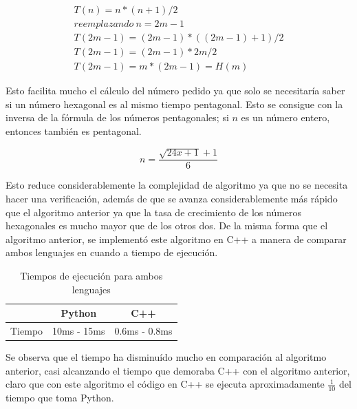 \documentclass[12pt]{article}
\begin{document}
\begin{equation}
   \begin{gathered}
      T(n) = n * (n + 1) / 2\\
      reemplazando ~n = 2m - 1\\
      T(2m - 1) = (2m - 1) * ((2m - 1) + 1) / 2\\
      T(2m - 1) = (2m - 1) * 2m / 2\\
      T(2m - 1) = m * (2m - 1) = H(m)
   \end{gathered}
\end{equation}

Esto facilita mucho el cálculo del número pedido ya que solo se necesitaría saber si un número hexagonal es al mismo tiempo pentagonal. Esto se consigue con la inversa de la fórmula de los números pentagonales; si $ n $ es un número entero, entonces también es pentagonal.

\begin{equation}
   n = \frac{\sqrt{24x + 1} + 1}{6}
\end{equation}

Esto reduce considerablemente la complejidad de algoritmo ya que no se necesita hacer una verificación, además de que se avanza considerablemente más rápido que el algoritmo anterior
ya que la tasa de crecimiento de los números hexagonales es mucho mayor que de los otros dos. De la misma forma que el algoritmo anterior, se implementó este algoritmo en C++ a
manera de comparar ambos lenguajes en cuando a tiempo de ejecución.

\begin{table}[H]
   \centering
   \caption{Tiempos de ejecución para ambos lenguajes\protect\footnotemark[\value{footnote}]}
   \begin{tabular}{ccc}
      & Python & C++\\
      \hline
      Tiempo & 10ms - 15ms & 0.6ms - 0.8ms\\
   \end{tabular}
\end{table}


Se observa que el tiempo ha disminuído mucho en comparación al algoritmo anterior, casi alcanzando el tiempo que demoraba C++ con el algoritmo anterior, claro que con este algoritmo
el código en C++ se ejecuta aproximadamente $ \frac{1}{10} $ del tiempo que toma Python.
\end{document}
